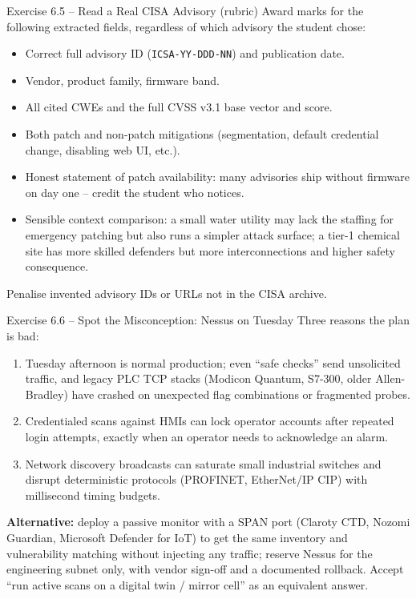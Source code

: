 \documentclass[11pt,a4paper]{article}
\begin{document}
\begin{taskbox}{Exercise 6.5 -- Read a Real CISA Advisory (rubric)}
Award marks for the following extracted fields, regardless of which
advisory the student chose:
\begin{itemize}
  \item Correct full advisory ID (\texttt{ICSA-YY-DDD-NN}) and
        publication date.
  \item Vendor, product family, firmware band.
  \item All cited CWEs and the full CVSS v3.1 base vector and score.
  \item Both patch and non-patch mitigations (segmentation, default
        credential change, disabling web UI, etc.).
  \item Honest statement of patch availability: many advisories ship
        without firmware on day one -- credit the student who notices.
  \item Sensible context comparison: a small water utility may lack
        the staffing for emergency patching but also runs a simpler
        attack surface; a tier-1 chemical site has more skilled
        defenders but more interconnections and higher safety
        consequence.
\end{itemize}
Penalise invented advisory IDs or URLs not in the CISA archive.
\end{taskbox}

\begin{taskbox}{Exercise 6.6 -- Spot the Misconception: Nessus on Tuesday}
Three reasons the plan is bad:
\begin{enumerate}
  \item Tuesday afternoon is normal production; even ``safe checks''
        send unsolicited traffic, and legacy PLC TCP stacks (Modicon
        Quantum, S7-300, older Allen-Bradley) have crashed on
        unexpected flag combinations or fragmented probes.
  \item Credentialed scans against HMIs can lock operator accounts
        after repeated login attempts, exactly when an operator
        needs to acknowledge an alarm.
  \item Network discovery broadcasts can saturate small industrial
        switches and disrupt deterministic protocols (PROFINET,
        EtherNet/IP CIP) with millisecond timing budgets.
\end{enumerate}
\textbf{Alternative:} deploy a passive monitor with a SPAN port
(Claroty CTD, Nozomi Guardian, Microsoft Defender for IoT) to get
the same inventory and vulnerability matching without injecting any
traffic; reserve Nessus for the engineering subnet only, with vendor
sign-off and a documented rollback. Accept ``run active scans on a
digital twin / mirror cell'' as an equivalent answer.
\end{taskbox}
\end{document}
